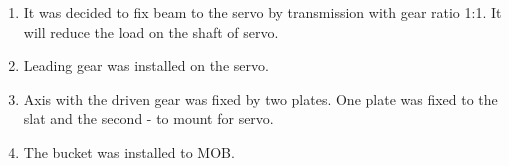 \begin{enumerate}
\begin{enumerate}
      \item It was decided to fix beam to the servo by transmission with gear ratio 1:1. It will reduce the load on the shaft of servo.
      
      \item Leading gear was installed on the servo.
      
      \item Axis with the driven gear was fixed by two plates. One plate was fixed to the slat and the second - to mount for servo.
      
      \item The bucket was installed to MOB.
      \begin{figure}[H]
      	\begin{minipage}[h]{0.47\linewidth}
      	\end{minipage}
      	\hfill
      	\begin{minipage}[h]{0.47\linewidth}

\end{minipage}
\end{figure}
\end{enumerate}
\end{enumerate}
